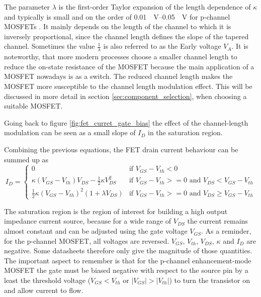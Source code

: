 The parameter $\lambda$ is the first-order Taylor expansion of the length dependence of $\kappa$ and typically is small and on the order of \qtyrange[range-units = single, per-mode=power]{0.01}{0.05}{\per \volt} for p-channel MOSFETs \citep[p. 23]{mosfet_flicker_noise}. It mainly depends on the length of the channel to which it is inversely proportional, since the channel length defines the slope of the tapered channel. Sometimes the value $\frac{1}{\lambda}$ is also referred to as the Early voltage $V_A$. It is noteworthy, that more modern processes choose a smaller channel length to reduce the on-state resistance of the MOSFET because the main application of a MOSFET nowadays is as a switch. The reduced channel length makes the MOSFET more susceptible to the channel length modulation effect. This will be discussed in more detail in section \ref{sec:component_selection}, when choosing a suitable MOSFET.

Going back to figure \ref{fig:fet_curret_gate_bias} the effect of the channel-length modulation can be seen as a small slope of $I_D$ in the saturation region.

Combining the previous equations, the FET drain current behaviour can be summed up as
\begin{equation}
    I_D = \begin{cases}
        0 & \text{if } V_{GS} - V_{th} < 0\\
        \kappa (V_{GS} - V_{th}) V_{DS} - \frac 1 2 \kappa V_{DS}^2 & \text{if } V_{GS} - V_{th} >= 0 \text{ and } V_{DS} < V_{GS} - V_{th}\\
        \frac 1 2 \kappa \left(V_{GS} - V_{th} \right)^2 (1 + \lambda V_{DS}) & \text{if } V_{GS} - V_{th} >= 0 \text{ and } V_{DS} \geq V_{GS} - V_{th}
    \end{cases}
    \label{eqn:mosfet_id_large_signal}
\end{equation}

The saturation region is the region of interest for building a high output impedance current source, because for a wide range of $V_{DS}$ the current remains almost constant and can be adjusted using the gate voltage $V_{GS}$. As a reminder, for the p-channel MOSFET, all voltages are reversed. $V_{GS}$, $V_{th}$, $V_{DS}$, $\kappa$ and $I_D$ are negative. Some datasheets therefore only give the magnitude of those quantities. The important aspect to remember is that for the p-channel enhancement-mode MOSFET the gate must be biased negative with respect to the source pin by a least the threshold voltage ($V_{GS} < V_{th}$ or $|V_{GS}| > |V_{th}|$) to turn the transistor on and allow current to flow.

